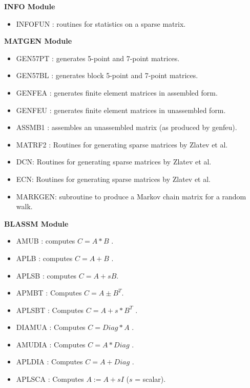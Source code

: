 \documentclass[12pt]{article}
\begin{document}
\vskip 0.3in
\centerline{\bf INFO Module}

\begin{itemize} 
\item INFOFUN :  routines for statistics on a sparse matrix.
\end{itemize}

\vskip 0.3in
\centerline{\bf MATGEN Module}

\begin{itemize} 

\item GEN57PT : generates 5-point and 7-point matrices.                   
\item GEN57BL  : generates block 5-point and 7-point matrices.             
\item GENFEA   : generates finite element matrices in assembled form.
\item GENFEU   : generates finite element matrices in unassembled form.     
\item ASSMB1   : assembles an unassembled matrix (as produced by genfeu).
\item MATRF2 :  Routines for generating sparse matrices by Zlatev et al.
\item  DCN:  Routines for generating sparse matrices by Zlatev et al.
\item  ECN:  Routines for generating sparse matrices by Zlatev et al.
\item MARKGEN: subroutine to produce a Markov chain matrix for 	
	a random walk.
\end{itemize}

\vskip 0.3in
\centerline{\bf BLASSM Module} 
\begin{itemize} 
\item AMUB   :   computes     $ C = A*B $ .
\item APLB   :   computes     $ C = A+B $  .                                
\item APLSB  :   computes     $ C = A + s B $.   
\item APMBT  :   Computes     $ C = A \pm  B^T $.   
\item APLSBT :   Computes     $ C = A + s * B^T $  .                     
\item DIAMUA :   Computes     $ C = Diag * A $  .                      
\item AMUDIA :   Computes     $ C = A* Diag $ .  
\item APLDIA :   Computes     $ C = A + Diag $  .
\item APLSCA :   Computes     $ A:= A + s I  $ ($s$ = scalar).
\end{itemize}
\end{document}

